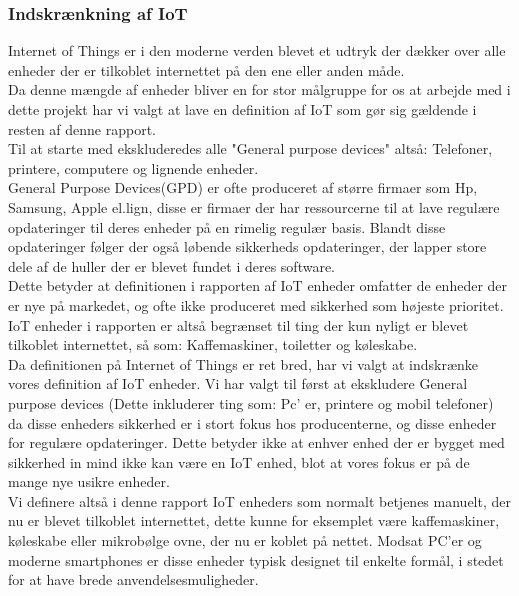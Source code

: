     
            \subsubsection{Indskrænkning af IoT}
            Internet of Things er i den moderne verden blevet et udtryk der dækker over alle enheder der er tilkoblet internettet på den ene eller anden måde.\\
            Da denne mængde af enheder bliver en for stor målgruppe for os at arbejde med i dette projekt har vi valgt at lave en definition af IoT som gør sig gældende i resten af denne rapport. \\
            Til at starte med ekskluderedes alle "General purpose devices" altså: Telefoner, printere, computere og lignende enheder. \\
            General Purpose Devices(GPD) er ofte produceret af større firmaer som Hp, Samsung, Apple el.lign, disse er firmaer der har ressourcerne til at lave regulære opdateringer til deres enheder på en rimelig regulær basis. Blandt disse opdateringer følger der også løbende sikkerheds opdateringer, der lapper store dele af de huller der er blevet fundet i deres software.\\
            Dette betyder at definitionen i rapporten af IoT enheder omfatter de enheder der er nye på markedet, og ofte ikke produceret med sikkerhed som højeste prioritet. IoT enheder i rapporten er altså begrænset til ting der kun nyligt er blevet tilkoblet internettet, så som: Kaffemaskiner, toiletter og køleskabe. \\
            
            
            
            Da definitionen på Internet of Things er ret bred, har vi valgt at indskrænke vores definition af IoT enheder. Vi har valgt til først at ekskludere General purpose devices (Dette inkluderer ting som: Pc' er, printere og mobil telefoner) da disse enheders sikkerhed er i stort fokus hos producenterne, og disse enheder for regulære opdateringer. Dette betyder ikke at enhver enhed der er bygget med sikkerhed
            in mind %
            ikke kan være en IoT enhed, blot at vores fokus er på de mange nye usikre enheder.\\
            Vi definere altså i denne rapport IoT enheders som normalt betjenes manuelt, der nu er blevet tilkoblet internettet, dette kunne for eksemplet være kaffemaskiner, køleskabe eller mikrobølge ovne, der nu er koblet på nettet. Modsat PC'er og moderne smartphones er disse enheder typisk designet til enkelte formål, i stedet for at have brede anvendelsesmuligheder.

\newpage


